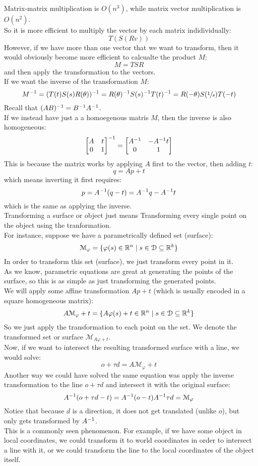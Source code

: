 \documentclass[12pt]{article}
\begin{document}
Matrix-matrix multiplication is $O(n^3)$,
while matrix vector multiplication is $O(n^2)$. \\
So it is more efficient to multiply the vector
by each matrix indidividually:
\[ T(S(Rv)) \]
However, if we have more than one vector
that we want to transform,
then it would obviously become more efficient
to calcualte the product $M$:
\[ M = TSR \]
and then apply the transformation to the vectors. \\

If we want the inverse of the transformation $M$:
\[ M^{-1} = (T(t)S(s)R(\theta))^{-1}
= R(\theta)^{-1} S(s)^{-1} T(t)^{-1} 
= R(-\theta)S(\sfrac{1}{s})T(-t) \]
Recall that $(AB)^{-1} = B^{-1} A^{-1}$. \\

If we instead have just a a homoegenous matris $M$,
then the inverse is also homogeneous:
\[ \begin{bmatrix} A & t \\ 0 & 1 \end{bmatrix}^{-1}
= \begin{bmatrix} A^{-1} & -A^{-1} t \\ 0 & 1 \end{bmatrix} \]
This is because the matrix works by applying $A$
first to the vector, then adding $t$:
\[ q = Ap + t \]
which means inverting it first requires:
\[ p = A^{-1}(q - t) = A^{-1} q -A^{-1} t \]
which is the same as applying the inverse. \\

Transforming a surface or object just means Transforming
every single point on the object using the tranformation. \\

For instance, suppose we have
a parametrically defined set (surface):
\[ \mathcal{M}_\varphi = 
\{ \varphi(s) \in \mathbb{R}^n \mid 
s \in \mathcal{D} \subseteq \mathbb{R}^k \} \]
In order to transform this set (surface),
we just transform every point in it. \\
As we know, parametric equations are great at
generating the points of the surface,
so this is as simple as just transforming the
generated points. \\
We will apply some affine transformation $Ap + t$
(which is usually encoded in a square
homogeneous matrix):
\[ A\mathcal{M}_\varphi + t
= \{ A\varphi(s) + t\in \mathbb{R}^n \mid 
s \in \mathcal{D} \subseteq \mathbb{R}^k \} \]
So we just apply the transformation
to each point on the set.
We denote the transformed set or surface
$\mathcal{M}_{A\varphi + t}$. \\

Now, if we want to intersect the resulting
transformed surface with a line,
we would solve:
\[ o + \tau d = A\mathcal{M}_\varphi + t \]
Another way we could have solved the same
equation was apply the inverse transformation
to the line $o + \tau d$
and intersect it with the original surface:
\[ A^{-1}(o + \tau d - t)
= A^{-1}(o - t) A^{-1} \tau d 
= \mathcal{M}_\varphi \]
Notice that because $d$ is a direction,
it does not get translated (unlike $o$),
but only gets transformed by $A^{-1}$. \\
This is a commonly seen phenomenon.
For example, if we have some object in
local coordinates, we could 
transform it to world coordinates
in order to intersect a line with it,
or we could transform the line to the local
coordinates of the object itself. \\
\end{document}
